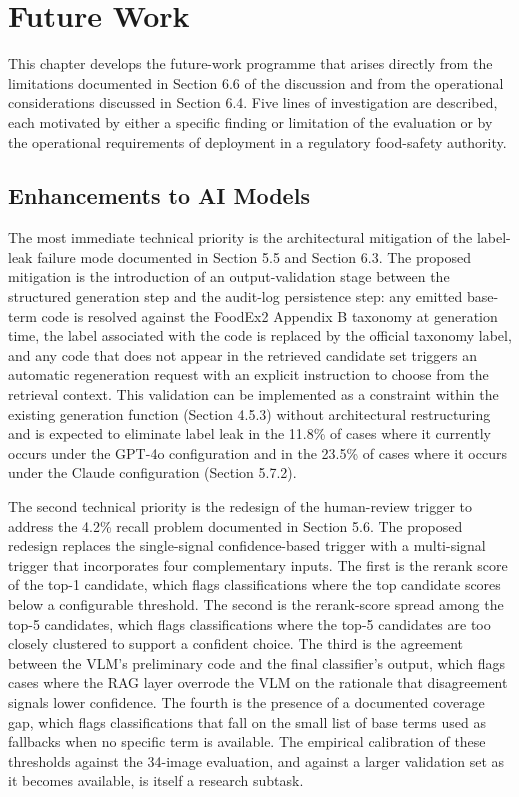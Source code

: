 \hypertarget{future-work}{%
\chapter{Future Work}\label{future-work}}

This chapter develops the future-work programme that arises directly from the limitations documented in Section 6.6 of the discussion and from the operational considerations discussed in Section 6.4. Five lines of investigation are described, each motivated by either a specific finding or limitation of the evaluation or by the operational requirements of deployment in a regulatory food-safety authority.

\hypertarget{enhancements-to-ai-models}{%
\section{Enhancements to AI Models}\label{enhancements-to-ai-models}}

The most immediate technical priority is the architectural mitigation of the label-leak failure mode documented in Section 5.5 and Section 6.3. The proposed mitigation is the introduction of an output-validation stage between the structured generation step and the audit-log persistence step: any emitted base-term code is resolved against the FoodEx2 Appendix B taxonomy at generation time, the label associated with the code is replaced by the official taxonomy label, and any code that does not appear in the retrieved candidate set triggers an automatic regeneration request with an explicit instruction to choose from the retrieval context. This validation can be implemented as a constraint within the existing generation function (Section 4.5.3) without architectural restructuring and is expected to eliminate label leak in the 11.8\% of cases where it currently occurs under the GPT-4o configuration and in the 23.5\% of cases where it occurs under the Claude configuration (Section 5.7.2).

The second technical priority is the redesign of the human-review trigger to address the 4.2\% recall problem documented in Section 5.6. The proposed redesign replaces the single-signal confidence-based trigger with a multi-signal trigger that incorporates four complementary inputs. The first is the rerank score of the top-1 candidate, which flags classifications where the top candidate scores below a configurable threshold. The second is the rerank-score spread among the top-5 candidates, which flags classifications where the top-5 candidates are too closely clustered to support a confident choice. The third is the agreement between the VLM's preliminary code and the final classifier's output, which flags cases where the RAG layer overrode the VLM on the rationale that disagreement signals lower confidence. The fourth is the presence of a documented coverage gap, which flags classifications that fall on the small list of base terms used as fallbacks when no specific term is available. The empirical calibration of these thresholds against the 34-image evaluation, and against a larger validation set as it becomes available, is itself a research subtask.

